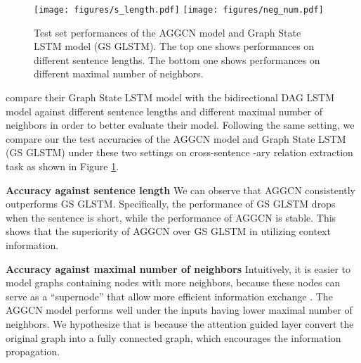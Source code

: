 \documentclass[11pt,a4paper]{article}
\begin{document}
\begin{figure}
    \centering
    \texttt{[image: figures/s\_length.pdf]}
    \texttt{[image: figures/neg\_num.pdf]}
    \caption{Test set performances of the AGGCN model and Graph State LSTM model (GS GLSTM). The top one shows performances on different sentence lengths. The bottom one shows performances on different maximal number of neighbors.}
    \label{fig:Figure7}
\end{figure}
\noindent
\citet{Song2018NaryRE} compare their Graph State LSTM model with the bidirectional DAG LSTM model against different sentence lengths and different maximal number of neighbors in order to better evaluate their model. Following the same setting, we compare our the test accuracies of the AGGCN model and Graph State LSTM  (GS GLSTM) under these two settings on cross-sentence -ary relation extraction task as shown in Figure \ref{fig:Figure7}.

\textbf{Accuracy against sentence length}
We can observe that AGGCN consistently outperforms GS GLSTM. Specifically, the performance of GS GLSTM drops when the sentence is short, while the performance of AGGCN is stable. This shows that the superiority of AGGCN over GS GLSTM in utilizing context information.

\textbf{Accuracy against maximal number of neighbors}
Intuitively, it is easier to model graphs containing nodes with more neighbors, because these nodes can serve as a ``supernode'' that allow more efficient information exchange \citep{Song2018NaryRE}. The AGGCN model performs well under the inputs having lower maximal number of neighbors. We hypothesize that is because the attention guided layer convert the original graph into a fully connected graph, which encourages the information propagation.   
\end{document}
